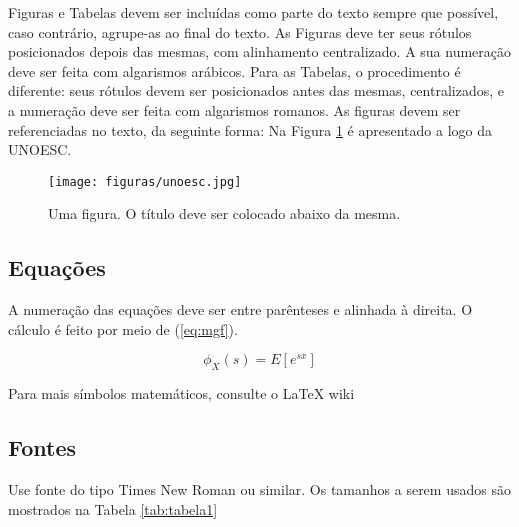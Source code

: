 Figuras e Tabelas devem ser incluídas como parte do texto sempre que possível, caso contrário, agrupe-as ao final do texto. As Figuras deve ter seus rótulos posicionados depois das mesmas, com alinhamento centralizado. A sua numeração deve ser feita com algarismos arábicos. Para as Tabelas, o procedimento é diferente: seus rótulos devem ser posicionados antes das mesmas, centralizados, e a numeração deve ser feita com algarismos romanos. As figuras devem ser referenciadas no texto, da seguinte forma: Na Figura \ref{fig:unoesc} é apresentado a logo da UNOESC.

\begin{figure}[h]
    \centering
    \texttt{[image: figuras/unoesc.jpg]}
    \caption{Uma figura. O título deve ser colocado abaixo da mesma.}
    \label{fig:unoesc}
\end{figure}

\subsection{Equações}
A numeração das equações deve ser entre parênteses e alinhada à direita. O cálculo é feito por meio de (\ref{eq:mgf}).

\begin{equation}
\label{eq:mgf}
\phi_X(s)=E[e^{sx}]
\end{equation}

Para mais símbolos matemáticos, consulte o LaTeX wiki \cite{latexMath}

\subsection{Fontes}

Use fonte do tipo Times New Roman ou similar. Os tamanhos a serem usados são mostrados na Tabela \ref{tab:tabela1}

